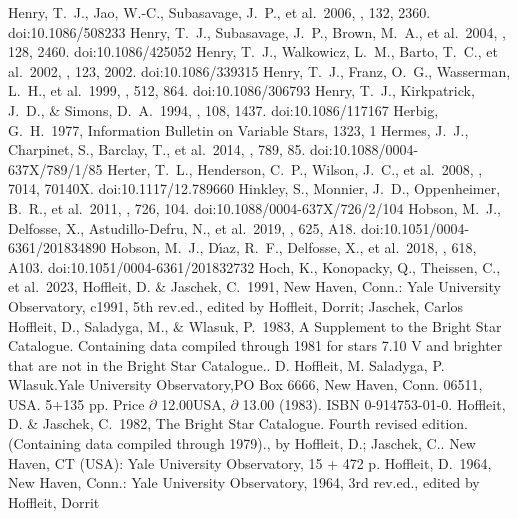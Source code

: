 \documentclass[twocolumn,tighten,twocolappendix]{aastex631}
\begin{document}
\begin{thebibliography}{}
 Henry, T.~J., Jao, W.-C., Subasavage, J.~P., et al.\ 2006, \aj, 132, 2360. doi:10.1086/508233
 Henry, T.~J., Subasavage, J.~P., Brown, M.~A., et al.\ 2004, \aj, 128, 2460. doi:10.1086/425052
 Henry, T.~J., Walkowicz, L.~M., Barto, T.~C., et al.\ 2002, \aj, 123, 2002. doi:10.1086/339315
 Henry, T.~J., Franz, O.~G., Wasserman, L.~H., et al.\ 1999, \apj, 512, 864. doi:10.1086/306793
 Henry, T.~J., Kirkpatrick, J.~D., \& Simons, D.~A.\ 1994, \aj, 108, 1437. doi:10.1086/117167
 Herbig, G.~H.\ 1977, Information Bulletin on Variable Stars, 1323, 1
 Hermes, J.~J., Charpinet, S., Barclay, T., et al.\ 2014, \apj, 789, 85. doi:10.1088/0004-637X/789/1/85
 Herter, T.~L., Henderson, C.~P., Wilson, J.~C., et al.\ 2008, \procspie, 7014, 70140X. doi:10.1117/12.789660
 Hinkley, S., Monnier, J.~D., Oppenheimer, B.~R., et al.\ 2011, \apj, 726, 104. doi:10.1088/0004-637X/726/2/104
 Hobson, M.~J., Delfosse, X., Astudillo-Defru, N., et al.\ 2019, \aap, 625, A18. doi:10.1051/0004-6361/201834890
 Hobson, M.~J., D{\'\i}az, R.~F., Delfosse, X., et al.\ 2018, \aap, 618, A103. doi:10.1051/0004-6361/201832732
 Hoch, K., Konopacky, Q., Theissen, C., et al.\ 2023, \aas
{} Hoffleit, D. \& Jaschek, C.\ 1991, New Haven, Conn.: Yale University Observatory, c1991, 5th rev.ed., edited by Hoffleit, Dorrit; Jaschek, Carlos
 Hoffleit, D., Saladyga, M., \& Wlasuk, P.\ 1983, A Supplement to the Bright Star Catalogue. Containing data compiled through 1981 for stars 7.10 V and brighter that are not in the Bright Star Catalogue.. D. Hoffleit, M. Saladyga, P. Wlasuk.Yale University Observatory,PO Box 6666, New Haven, Conn. 06511, USA. 5+135 pp. Price {\ensuremath{\partial}} 12.00USA, {\ensuremath{\partial}} 13.00 (1983). ISBN 0-914753-01-0.
 Hoffleit, D. \& Jaschek, C.\ 1982, The Bright Star Catalogue. Fourth revised edition. (Containing data compiled through 1979)., by Hoffleit, D.; Jaschek, C..  New Haven, CT (USA): Yale University Observatory, 15 + 472 p.
 Hoffleit, D.\ 1964, New Haven, Conn.: Yale University Observatory, 1964, 3rd rev.ed., edited by Hoffleit, Dorrit

\end{thebibliography}
\end{document}
